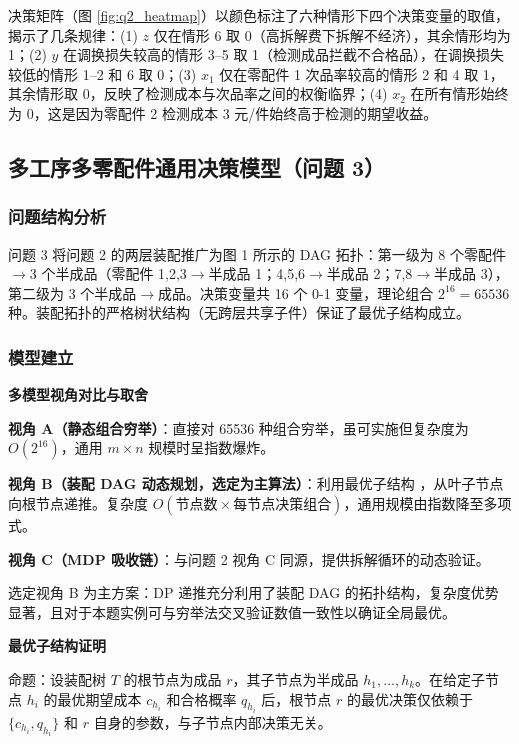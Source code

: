 \documentclass[12pt,a4paper]{ctexart}
\begin{document}
决策矩阵（图 \ref{fig:q2_heatmap}）以颜色标注了六种情形下四个决策变量的取值，揭示了几条规律：(1) $z$ 仅在情形 6 取 0（高拆解费下拆解不经济），其余情形均为 1；(2) $y$ 在调换损失较高的情形 3--5 取 1（检测成品拦截不合格品），在调换损失较低的情形 1--2 和 6 取 0；(3) $x_1$ 仅在零配件 1 次品率较高的情形 2 和 4 取 1，其余情形取 0，反映了检测成本与次品率之间的权衡临界；(4) $x_2$ 在所有情形始终为 0，这是因为零配件 2 检测成本 3 元/件始终高于检测的期望收益。

\subsection{多工序多零配件通用决策模型（问题 3）}

\subsubsection{问题结构分析}

问题 3 将问题 2 的两层装配推广为图 1 所示的 DAG 拓扑：第一级为 8 个零配件$\to$3 个半成品（零配件 1,2,3$\to$半成品 1；4,5,6$\to$半成品 2；7,8$\to$半成品 3），第二级为 3 个半成品$\to$成品。决策变量共 16 个 0-1 变量，理论组合 $2^{16}=65536$ 种。装配拓扑的严格树状结构（无跨层共享子件）保证了最优子结构成立。

\subsubsection{模型建立}

\textbf{多模型视角对比与取舍}

\textbf{视角 A（静态组合穷举）}：直接对 65536 种组合穷举，虽可实施但复杂度为 $O(2^{16})$，通用 $m\times n$ 规模时呈指数爆炸。

\textbf{视角 B（装配 DAG 动态规划，选定为主算法）}：利用最优子结构 \cite{ref4}，从叶子节点向根节点递推。复杂度 $O(\text{节点数}\times\text{每节点决策组合})$，通用规模由指数降至多项式。

\textbf{视角 C（MDP 吸收链）}：与问题 2 视角 C 同源，提供拆解循环的动态验证。

选定视角 B 为主方案：DP 递推充分利用了装配 DAG 的拓扑结构，复杂度优势显著，且对于本题实例可与穷举法交叉验证数值一致性以确证全局最优。

\textbf{最优子结构证明}

命题：设装配树 $T$ 的根节点为成品 $r$，其子节点为半成品 $h_1,\dots,h_k$。在给定子节点 $h_i$ 的最优期望成本 $c_{h_i}$ 和合格概率 $q_{h_i}$ 后，根节点 $r$ 的最优决策仅依赖于 $\{c_{h_i},q_{h_i}\}$ 和 $r$ 自身的参数，与子节点内部决策无关。
\end{document}
